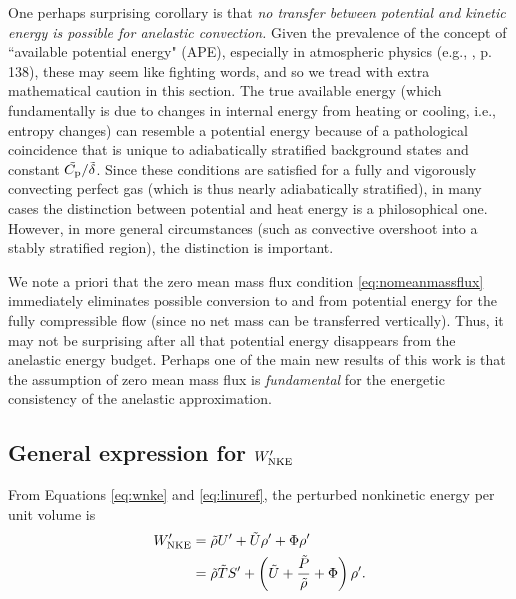 \documentclass[12pt]{article}
\newcommand{\wpnke}{W^\prime_{\rm NKE}}
\newcommand{\wpheat}{W^\prime_{\rm heat}}
\newcommand{\wpcomp}{W^\prime_{\rm comp}}
\begin{document}
One perhaps surprising corollary is that \textit{no transfer between potential and kinetic energy is possible for anelastic convection.} Given the prevalence of the concept of ``available potential energy" (APE), especially in atmospheric physics (e.g., \citealt{Vallis2017}, p. 138), these may seem like fighting words, and so we tread with extra mathematical caution in this section. The true available energy (which fundamentally is due to changes in internal energy from heating or cooling, i.e., entropy changes) can resemble a potential energy because of a pathological coincidence that is unique to adiabatically stratified background states and constant $\tilde{C_{\rm{p}}}/\tilde{\delta}$. Since these conditions are satisfied for a fully and vigorously convecting perfect gas (which is thus nearly adiabatically stratified), in many cases the distinction between potential and heat energy is a philosophical one. However, in more general circumstances (such as convective overshoot into a stably stratified region), the distinction is important. 

We note a priori that the zero mean mass flux condition \eqref{eq:nomeanmassflux} immediately eliminates possible conversion to and from potential energy for the fully compressible flow (since no net mass can be transferred vertically). Thus, it may not be surprising after all that potential energy disappears from the anelastic energy budget. Perhaps one of the main new results of this work is that the assumption of zero mean mass flux is \textit{fundamental} for the energetic consistency of the anelastic approximation. 

\subsection{General expression for $\wpnke$}
From Equations \eqref{eq:wnke} and \eqref{eq:linuref}, the perturbed nonkinetic energy per unit volume is 
\begin{align}\label{eq:wp1}
	\wpnke &=  \rhotilde U^\prime + \tilde{U}\rhoprime + \Phi \rhoprime \nonumber\\
	&= \rhotilde\tmptilde \entrprime + \left(\tilde{U}+\frac{\tilde{P}}{\rhotilde}+\Phi\right)\rhoprime.
\end{align}
\end{document}
